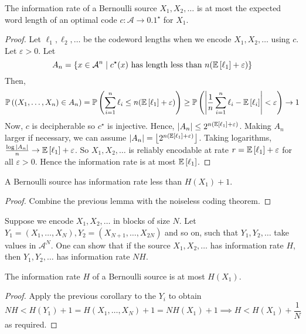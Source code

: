 \begin{lemma}
    The information rate of a Bernoulli source \( X_1, X_2, \dots \) is at most the expected word length of an optimal code \( c \colon \mathcal A \to \qty{0,1}^\star \) for \( X_1 \).
\end{lemma}
\begin{proof}
    Let \( \ell_1, \ell_2, \dots \) be the codeword lengths when we encode \( X_1, X_2, \dots \) using \( c \).
    Let \( \varepsilon > 0 \).
    Let
    \[ A_n = \qty{x \in \mathcal A^n \mid c^\star(x) \text{ has length less than } n \qty(\expect{\ell_1} + \varepsilon)} \]
    Then,
    \[ \prob{(X_1, \dots, X_n) \in A_n} = \prob{\sum_{i=1}^n \ell_i \leq n \qty(\expect{\ell_1} + \varepsilon)} \ge \prob{\abs{\frac{1}{n} \sum_{i=1}^n \ell_i - \expect{\ell_i}} < \varepsilon} \to 1 \]
    Now, \( c \) is decipherable so \( c^\star \) is injective.
    Hence, \( \abs{A_n} \leq 2^{n\qty(\expect{\ell_1} + \varepsilon)} \).
    Making \( A_n \) larger if necessary, we can assume \( \abs{A_n} = \floor*{2^{n\qty(\expect{\ell_1} + \varepsilon)}} \).
    Taking logarithms, \( \frac{\log \abs{A_n}}{n} \to \expect{\ell_1} + \varepsilon \).
    So \( X_1, X_2, \dots \) is reliably encodable at rate \( r = \expect{\ell_1} + \varepsilon \) for all \( \varepsilon > 0 \).
    Hence the information rate is at most \( \expect{\ell_1} \).
\end{proof}
\begin{corollary}
    A Bernoulli source has information rate less than \( H(X_1) + 1 \).
\end{corollary}
\begin{proof}
    Combine the previous lemma with the noiseless coding theorem.
\end{proof}
Suppose we encode \( X_1, X_2, \dots \) in blocks of size \( N \).
Let \( Y_1 = (X_1, \dots, X_N), Y_2 = (X_{N+1}, \dots, X_{2N}) \) and so on, such that \( Y_1, Y_2, \dots \) take values in \( \mathcal A^N \).
One can show that if the source \( X_1, X_2, \dots \) has information rate \( H \), then \( Y_1, Y_2, \dots \) has information rate \( NH \).
\begin{proposition}
    The information rate \( H \) of a Bernoulli source is at most \( H(X_1) \).
\end{proposition}
\begin{proof}
    Apply the previous corollary to the \( Y_i \) to obtain
    \[ NH < H(Y_1) + 1 = H(X_1, \dots, X_N) + 1 = NH(X_1) + 1 \implies H < H(X_1) + \frac{1}{N} \]
    as required.
\end{proof}

